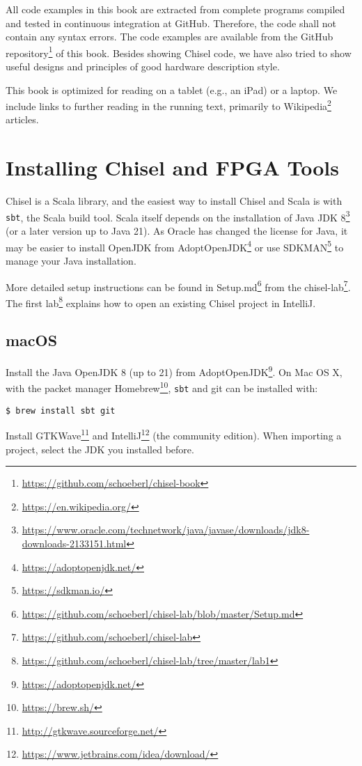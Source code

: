 \documentclass[%
    10pt,
    headinclude, footexclude,
    openright, %
    notitlepage,
    cleardoubleempty,
    headsepline,
    pointlessnumbers,
    bibtotoc, idxtotoc,
    ]{scrbook}
\newcommand{\code}[1]{{\lstinline[basicstyle=\small\ttfamily]{#1}}}
\newcommand{\myref}[2]{\href{#1}{#2}}
\renewcommand{\myref}[2]{{#2}{\footnote{\url{#1}}}}
\begin{document}
All code examples in this book are extracted from complete programs
compiled and tested in continuous integration at GitHub.
Therefore, the code shall not contain
any syntax errors. The code examples are available from the
\myref{https://github.com/schoeberl/chisel-book}{GitHub repository}
of this book.
Besides showing Chisel code, we have also tried to show useful designs and
principles of good hardware description style.

This book is optimized for reading on a tablet (e.g., an iPad) or a laptop.
We include links to further reading in the running text, primarily to
\myref{https://en.wikipedia.org/}{Wikipedia} articles.

\section{Installing Chisel and FPGA Tools}

Chisel is a Scala library, and the easiest way to install Chisel and Scala is
with \code{sbt}, the Scala build tool. Scala itself depends on the installation
of \myref{https://www.oracle.com/technetwork/java/javase/downloads/jdk8-downloads-2133151.html}{Java JDK 8}
(or a later version up to Java 21).
As Oracle has changed the license for Java, it may be easier to
install OpenJDK from \myref{https://adoptopenjdk.net/}{AdoptOpenJDK}
or use \myref{https://sdkman.io/}{SDKMAN} to manage your Java installation.

More detailed setup instructions can be found in
\myref{https://github.com/schoeberl/chisel-lab/blob/master/Setup.md}{Setup.md}
from the \myref{https://github.com/schoeberl/chisel-lab}{chisel-lab}.
The \myref{https://github.com/schoeberl/chisel-lab/tree/master/lab1}{first lab}
explains how to open an existing Chisel project in IntelliJ.

\subsection{macOS}

Install the Java OpenJDK 8 (up to 21) from \myref{https://adoptopenjdk.net/}{AdoptOpenJDK}.
On Mac OS X, with the packet manager \myref{https://brew.sh/}{Homebrew},
\code{sbt} and git can be installed with:

\begin{verbatim}
$ brew install sbt git
\end{verbatim}

Install \myref{http://gtkwave.sourceforge.net/}{GTKWave} and
\myref{https://www.jetbrains.com/idea/download/}{IntelliJ} (the community edition).
When importing a project, select the JDK you installed before.
\end{document}
